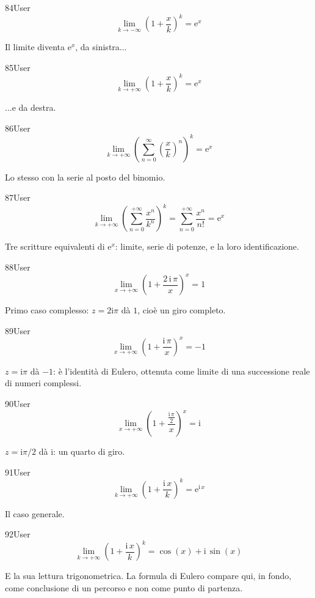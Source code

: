 \begin{espr}{84}{User}{\verificata}
\[
\lim_{k \to -\infty} \left(1 + \frac{x}{k}\right)^{k} = \mathrm{e}^{x}
\]
\end{espr}
Il limite diventa $\mathrm{e}^x$, da sinistra...

\begin{espr}{85}{User}{\verificata}
\[
\lim_{k \to +\infty} \left(1 + \frac{x}{k}\right)^{k} = \mathrm{e}^{x}
\]
\end{espr}
...e da destra.

\begin{espr}{86}{User}{\verificata}
\[
\lim_{k \to +\infty} \left(\sum_{n=0}^{\infty} \left(\frac{x}{k}\right)^{n}\right)^{k} = \mathrm{e}^{x}
\]
\end{espr}
Lo stesso con la serie al posto del binomio.

\begin{espr}{87}{User}{\verificata}
\[
\lim_{k \to +\infty} \left(\sum_{n=0}^{+\infty} \frac{x^{n}}{k^{n}}\right)^{k} = \sum_{n=0}^{+\infty} \frac{x^{n}}{n!} = \mathrm{e}^{x}
\]
\end{espr}
Tre scritture equivalenti di $\mathrm{e}^x$: limite, serie di potenze, e la loro identificazione.

\begin{espr}{88}{User}{}
\[
\lim_{x \to +\infty} \left(1 + \frac{2\, \mathrm{i}\, \pi}{x}\right)^{x} = 1
\]
\end{espr}
Primo caso complesso: $z=2\mathrm{i}\pi$ dà $1$, cioè un giro completo.

\begin{espr}{89}{User}{\verificata}
\[
\lim_{x \to +\infty} \left(1 + \frac{\mathrm{i}\, \pi}{x}\right)^{x} = -1
\]
\end{espr}
$z=\mathrm{i}\pi$ dà $-1$: è l'identità di Eulero, ottenuta come limite di una successione reale di numeri complessi.

\begin{espr}{90}{User}{\verificata}
\[
\lim_{x \to +\infty} \left(1 + \frac{\frac{\mathrm{i}\, \pi}{2}}{x}\right)^{x} = \mathrm{i}
\]
\end{espr}
$z=\mathrm{i}\pi/2$ dà $\mathrm{i}$: un quarto di giro.

\begin{espr}{91}{User}{\verificata}
\[
\lim_{k \to +\infty} \left(1 + \frac{\mathrm{i}\, x}{k}\right)^{k} = \mathrm{e}^{\mathrm{i}\, x}
\]
\end{espr}
Il caso generale.

\begin{espr}{92}{User}{\verificata}
\[
\lim_{k \to +\infty} \left(1 + \frac{\mathrm{i}\, x}{k}\right)^{k} = \cos\!\left(x\right) + \mathrm{i}\, \sin\!\left(x\right)
\]
\end{espr}
E la sua lettura trigonometrica. La formula di Eulero compare qui, in fondo, come conclusione di un percorso e non come punto di partenza.

